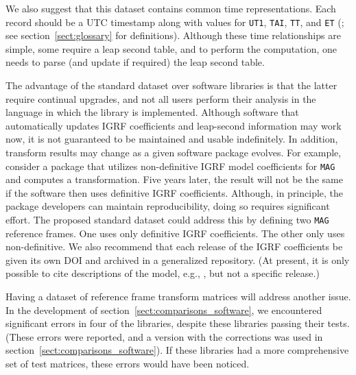 \documentclass[draft]{agujournal2019}
\begin{document}
We also suggest that this dataset contains common time representations. Each record should be a UTC timestamp along with values for \texttt{UT1}, \texttt{TAI}, \texttt{TT}, and \texttt{ET} (; see section~\ref{sect:glossary} for definitions). Although these time relationships are simple, some require a leap second table, and to perform the computation, one needs to parse (and update if required) the leap second table.



The advantage of the standard dataset over software libraries is that the latter require continual upgrades, and not all users perform their analysis in the language in which the library is implemented. Although software that automatically updates IGRF coefficients and leap-second information may work now, it is not guaranteed to be maintained and usable indefinitely. In addition, transform results may change as a given software package evolves. For example, consider a package that utilizes non-definitive IGRF model coefficients for \texttt{MAG} and computes a transformation. Five years later, the result will not be the same if the software then uses definitive IGRF coefficients. Although, in principle, the package developers can maintain reproducibility, doing so requires significant effort. The proposed standard dataset could address this by defining two \texttt{MAG} reference frames. One uses only definitive IGRF coefficients. The other only uses non-definitive. We also recommend that each release of the IGRF coefficients be given its own DOI and archived in a generalized repository. (At present, it is only possible to cite descriptions of the model, e.g., , but not a specific release.)


Having a dataset of reference frame transform matrices will address another issue. In the development of section~\ref{sect:comparisons_software}, we encountered significant errors in four of the libraries, despite these libraries passing their tests. (These errors were reported, and a version with the corrections was used in section~\ref{sect:comparisons_software}). If these libraries had a more comprehensive set of test matrices, these errors would have been noticed.
\end{document}

